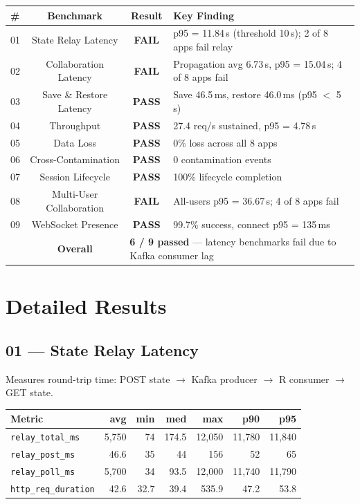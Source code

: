 \documentclass[11pt,a4paper]{article}
\newcommand{\pass}{\textcolor{pass}{\textbf{PASS}}}
\newcommand{\fail}{\textcolor{fail}{\textbf{FAIL}}}
\begin{document}
\begin{tabularx}{\textwidth}{@{}lccX@{}}
\toprule
\textbf{\#} & \textbf{Benchmark} & \textbf{Result} & \textbf{Key Finding} \\
\midrule
01 & State Relay Latency       & \fail & p95 = 11.84\,s (threshold 10\,s); 2 of 8 apps fail relay \\
02 & Collaboration Latency     & \fail & Propagation avg 6.73\,s, p95 = 15.04\,s; 4 of 8 apps fail \\
03 & Save \& Restore Latency   & \pass & Save 46.5\,ms, restore 46.0\,ms (p95 $<$ 5\,s) \\
04 & Throughput                 & \pass & 27.4 req/s sustained, p95 = 4.78\,s \\
05 & Data Loss                 & \pass & 0\% loss across all 8 apps \\
06 & Cross-Contamination       & \pass & 0 contamination events \\
07 & Session Lifecycle          & \pass & 100\% lifecycle completion \\
08 & Multi-User Collaboration   & \fail & All-users p95 = 36.67\,s; 4 of 8 apps fail \\
09 & WebSocket Presence         & \pass & 99.7\% success, connect p95 = 135\,ms \\
\midrule
   & \textbf{Overall}          & \multicolumn{2}{l}{\textbf{6 / 9 passed} — latency benchmarks fail due to Kafka consumer lag} \\
\bottomrule
\end{tabularx}

\section{Detailed Results}

\subsection{01 — State Relay Latency}

Measures round-trip time: POST state $\to$ Kafka producer $\to$ R consumer $\to$ GET state.

\begin{tabular}{@{}lrrrrrr@{}}
\toprule
\textbf{Metric} & \textbf{avg} & \textbf{min} & \textbf{med} & \textbf{max} & \textbf{p90} & \textbf{p95} \\
\midrule
\texttt{relay\_total\_ms}  & 5,750  & 74   & 174.5 & 12,050 & 11,780 & 11,840 \\
\texttt{relay\_post\_ms}   & 46.6   & 35   & 44    & 156    & 52     & 65     \\
\texttt{relay\_poll\_ms}   & 5,700  & 34   & 93.5  & 12,000 & 11,740 & 11,790 \\
\texttt{http\_req\_duration} & 42.6 & 32.7 & 39.4  & 535.9  & 47.2   & 53.8   \\
\bottomrule
\end{tabular}
\end{document}
